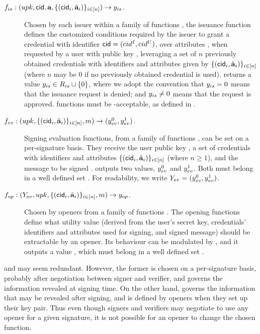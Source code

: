 \begin{description}
\item[$f_{is}: (upk,\mathsf{cid},\mathbf{a},\lbrace (\mathsf{cid}_i,\tilde{\mathbf{a}}_i)\rbrace_{i \in [n]})
  \rightarrow y_{is}$.] Chosen
  by each issuer within a family of functions \famfissue, the issuance function
  defines the customized conditions required by the issuer to grant a credential
  with identifier $\mathsf{cid} = (cid^I,cid^U)$, over attributes \attrs, when requested
  by a user with public key \upk,
  leveraging a set of $n$ previously obtained credentials with identifiers and
  attributes given by $\lbrace (\mathsf{cid}_i,\tilde{\mathbf{a}}_i) \rbrace_{i \in [n]}$ (where
  $n$ may be $0$ if no previously obtained credential is used). \fissue returns
  a value $y_{is} \in R_{is} \cup \lbrace 0 \rbrace$, where we adopt the
  convention that $y_{is} = 0$ means that the issuance request is denied; and
  $y_{is} \neq 0$ means that the request is approved. \fissue functions must be
  \UAS-acceptable, as defined in .
\item[$f_{ev}: (upk,\lbrace(\mathsf{cid}_i,\tilde{\mathbf{a}}_i)\rbrace_{i \in [n]},m)
  \rightarrow (y_{ev}^0,y_{ev}^1)$.] Signing evaluation functions, from a
  family of functions \famfeval, can be set on a per-signature basis. They
  receive the user public key \upk, a set of credentials with identifiers
  and attributes $\lbrace (\mathsf{cid}_i,\tilde{\mathbf{a}}_i) \rbrace_{i \in [n]}$
  (where $n \ge 1$), and the message to be signed \msg. \feval outputs two
  values, $y_{ev}^0$ and $y_{ev}^1$. Both must belong in a well defined set
  \rngfeval. For readability, we write $Y_{ev} = (y_{ev}^0,y_{ev}^1)$.
\item[$f_{op}: (Y_{ev},upk,\lbrace (\mathsf{cid}_i,\tilde{\mathbf{a}}_i) \rbrace_{i \in [n]},
  m) \rightarrow y_{op}$.]
  Chosen by openers from a family of functions \famfinsp. The opening
  functions define what utility value (derived from the user's secret key,
  credentials' identifiers and attributes used for signing, and signed message)
  should be extractable by an opener. Its behaviour can be modulated by \Yeval,
  and it outputs a value \yinsp, which must belong in a well defined set
  \rngfinsp.
\end{description}

\feval and \finsp may seem redundant. However, the former is chosen on a
per-signature basis, probably after negotiation between signer and verifier, and
governs the information revealed at signing time. On the other hand, \finsp
governs the information that may be revealed after signing, and is defined by
openers when they set up their key pair. Thus even though signers and verifiers
may negotiate to use any opener for a given signature, it is not possible for
an opener to change the chosen function.

